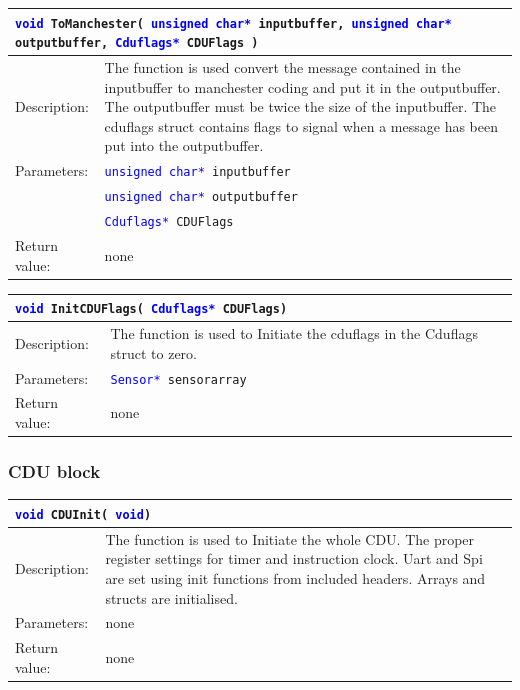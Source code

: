 \begin{table}[H]
\begin{tabular}{l p{12.5cm}}
\multicolumn{2}{p{15cm}}{\texttt{\textcolor{blue}{void} ToManchester( \texttt{\textcolor{blue}{unsigned char*} inputbuffer, \textcolor{blue}{unsigned char*} outputbuffer, \textcolor{blue}{Cduflags*} CDUFlags  }) } } \\
\hline
Description:& The function is used convert the message contained in the inputbuffer to manchester coding and put it in the outputbuffer. The outputbuffer must be twice the size of the inputbuffer. The cduflags struct contains flags to signal when a message has been put into the outputbuffer.\\
Parameters:&\texttt{\textcolor{blue}{unsigned char*} inputbuffer}\\
&\texttt{\textcolor{blue}{unsigned char*} outputbuffer}\\
&\texttt{\textcolor{blue}{Cduflags*} CDUFlags}\\
Return value:&none\\
\end{tabular}
\end{table}

\begin{table}[H]
\begin{tabular}{l p{12.5cm}}
\multicolumn{2}{l}{\texttt{\textcolor{blue}{void} InitCDUFlags( \texttt{\textcolor{blue}{Cduflags*} CDUFlags})}} \\
\hline
Description:& The function is used to Initiate the cduflags in the Cduflags struct to zero.\\
Parameters:&\texttt{\textcolor{blue}{Sensor*} sensorarray}\\
Return value:&none\\
\end{tabular}
\end{table}

\subsubsection{CDU block}
\begin{table}[H]
\begin{tabular}{l p{12.5cm}}
\multicolumn{2}{l}{\texttt{\textcolor{blue}{void} CDUInit( \texttt{\textcolor{blue}{void}})}} \\
\hline
Description:& The function is used to Initiate the whole CDU. The proper register settings for timer and instruction clock. Uart and Spi are set using init functions from included headers. Arrays and structs are initialised.\\
Parameters:&none\\
Return value:&none\\
\end{tabular}
\end{table}

